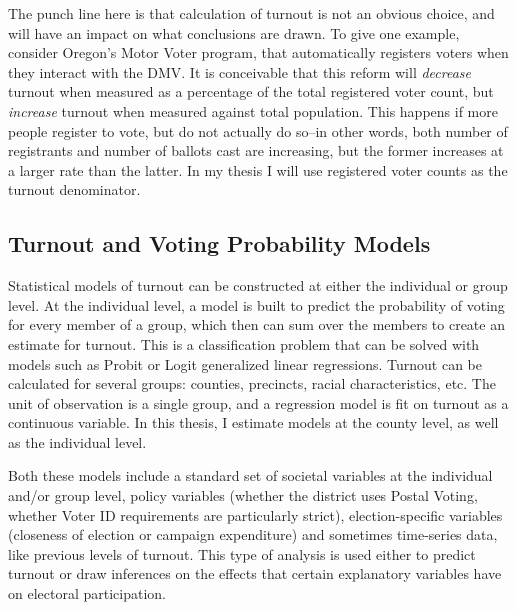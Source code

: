 \documentclass[12pt,twoside]{reedthesis}
\begin{document}
  The punch line here is that calculation of turnout is not an obvious
  choice, and will have an impact on what conclusions are drawn. To give
  one example, consider Oregon's Motor Voter program, that automatically
  registers voters when they interact with the DMV. It is conceivable that
  this reform will \emph{decrease} turnout when measured as a percentage
  of the total registered voter count, but \emph{increase} turnout when
  measured against total population. This happens if more people register
  to vote, but do not actually do so--in other words, both number of
  registrants and number of ballots cast are increasing, but the former
  increases at a larger rate than the latter. In my thesis I will use
  registered voter counts as the turnout denominator.
  
  \subsection{Turnout and Voting Probability
  Models}\label{turnout-and-voting-probability-models}
  
  Statistical models of turnout can be constructed at either the
  individual or group level. At the individual level, a model is built to
  predict the probability of voting for every member of a group, which
  then can sum over the members to create an estimate for turnout. This is
  a classification problem that can be solved with models such as Probit
  or Logit generalized linear regressions. Turnout can be calculated for
  several groups: counties, precincts, racial characteristics, etc. The
  unit of observation is a single group, and a regression model is fit on
  turnout as a continuous variable. In this thesis, I estimate models at
  the county level, as well as the individual level.
  
  Both these models include a standard set of societal variables at the
  individual and/or group level, policy variables (whether the district
  uses Postal Voting, whether Voter ID requirements are particularly
  strict), election-specific variables (closeness of election or campaign
  expenditure) and sometimes time-series data, like previous levels of
  turnout. This type of analysis is used either to predict turnout or draw
  inferences on the effects that certain explanatory variables have on
  electoral participation.
  
\end{document}
